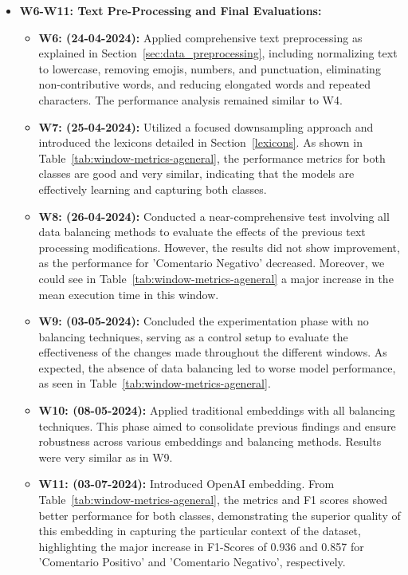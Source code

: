 \begin{itemize}
    \item \textbf{W6-W11: Text Pre-Processing and Final Evaluations:}
        \begin{itemize}
            \item \textbf{W6: (24-04-2024):} Applied comprehensive text preprocessing as explained in Section~\ref{sec:data_preprocessing}, including normalizing text to lowercase, removing emojis, numbers, and punctuation, eliminating non-contributive words, and reducing elongated words and repeated characters. The performance analysis remained similar to W4.
        
            \item \textbf{W7: (25-04-2024):} Utilized a focused downsampling approach and introduced the lexicons detailed in Section~\ref{lexicons}. As shown in Table~\ref{tab:window-metrics-ageneral}, the performance metrics for both classes are good and very similar, indicating that the models are effectively learning and capturing both classes.
        
            \item \textbf{W8: (26-04-2024):} Conducted a near-comprehensive test involving all data balancing methods to evaluate the effects of the previous text processing modifications. However, the results did not show improvement, as the performance for 'Comentario Negativo' decreased. Moreover, we could see in Table~\ref{tab:window-metrics-ageneral} a major increase in the mean execution time in this window.
        
            \item \textbf{W9: (03-05-2024):} Concluded the experimentation phase with no balancing techniques, serving as a control setup to evaluate the effectiveness of the changes made throughout the different windows. As expected, the absence of data balancing led to worse model performance, as seen in Table~\ref{tab:window-metrics-ageneral}.
        
            \item \textbf{W10: (08-05-2024):} Applied traditional embeddings with all balancing techniques. This phase aimed to consolidate previous findings and ensure robustness across various embeddings and balancing methods. Results were very similar as in W9.
        
            \item \textbf{W11: (03-07-2024):} Introduced OpenAI embedding. From Table~\ref{tab:window-metrics-ageneral}, the metrics and F1 scores showed better performance for both classes, demonstrating the superior quality of this embedding in capturing the particular context of the dataset, highlighting the major increase in F1-Scores of 0.936 and 0.857 for 'Comentario Positivo' and 'Comentario Negativo', respectively.
        \end{itemize}
\end{itemize}



